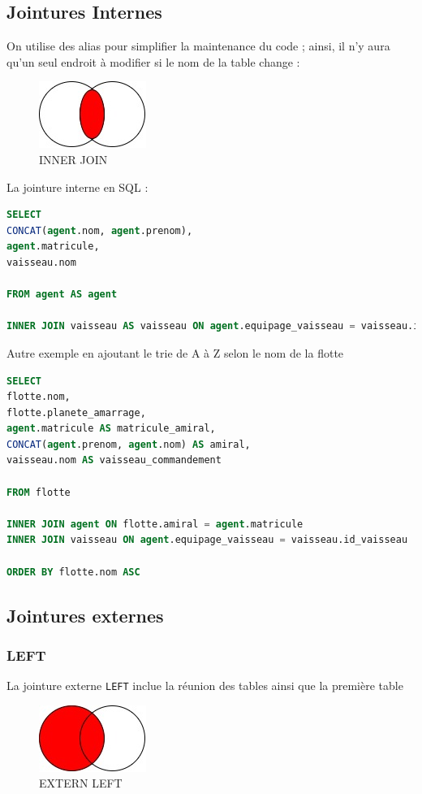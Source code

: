 \subsection{Jointures Internes}
On utilise des alias pour simplifier la maintenance du code ; ainsi, il n'y aura qu'un seul endroit à modifier si le nom de la table change :
\begin{figure}[H]
    \centering
    \includegraphics[width=0.25\linewidth]{image/INNER_JOIN.jpg}
    \caption{INNER JOIN}
    \label{fig:enter-label}
\end{figure}

La jointure interne en SQL :
\begin{lstlisting}[language=SQL]
SELECT
CONCAT(agent.nom, agent.prenom),
agent.matricule,
vaisseau.nom

FROM agent AS agent

INNER JOIN vaisseau AS vaisseau ON agent.equipage_vaisseau = vaisseau.id_vaisseau --Joint la seconde table
\end{lstlisting}

Autre exemple en ajoutant le trie de A à Z selon le nom de la flotte
\begin{lstlisting}[language=SQL]
SELECT
flotte.nom,
flotte.planete_amarrage,
agent.matricule AS matricule_amiral,
CONCAT(agent.prenom, agent.nom) AS amiral,
vaisseau.nom AS vaisseau_commandement

FROM flotte

INNER JOIN agent ON flotte.amiral = agent.matricule
INNER JOIN vaisseau ON agent.equipage_vaisseau = vaisseau.id_vaisseau

ORDER BY flotte.nom ASC
\end{lstlisting}

\subsection{Jointures externes}

\subsubsection{LEFT}
La jointure externe \texttt{LEFT} inclue la réunion des tables ainsi que la première table
\begin{figure}[H]
    \centering
    \includegraphics[width=0.25\linewidth]{image/LEFT.jpg}
    \caption{EXTERN LEFT}
    \label{fig:enter-label}
\end{figure}

